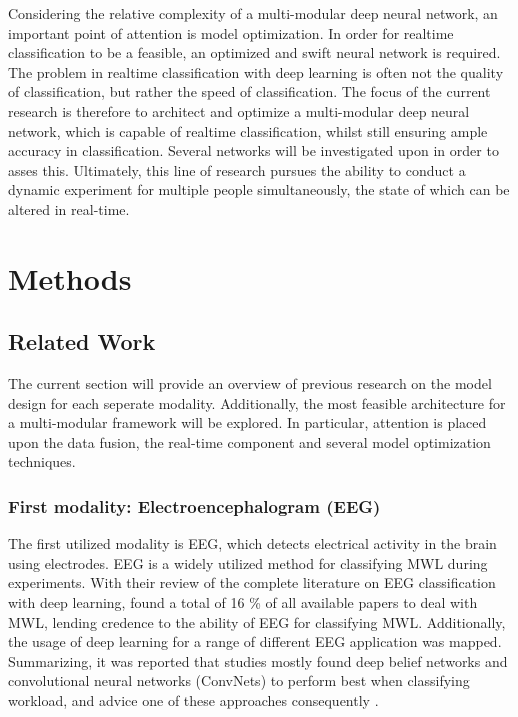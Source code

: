 \documentclass[12pt]{article}
\begin{document}
Considering the relative complexity of a multi-modular deep neural network, an important point of attention is model optimization. In order for realtime classification to be a feasible, an optimized and swift neural network is required. The problem in realtime classification with deep learning is often not the quality of classification, but rather the speed of classification. The focus of the current research is therefore to architect and optimize a multi-modular deep neural network, which is capable of realtime classification, whilst still ensuring ample accuracy in classification. Several networks will be investigated upon in order to asses this. Ultimately, this line of research pursues the ability to conduct a dynamic experiment for multiple people simultaneously, the state of which can be altered in real-time. 

\newpage
\section{Methods}

\subsection{Related Work} \label{Relatedwork}
The current section will provide an overview of previous research on the model design for each seperate modality. Additionally,  the most feasible architecture for a multi-modular framework will be explored. In particular, attention is placed upon the data fusion, the real-time component and several model optimization techniques.

\subsubsection{First modality: Electroencephalogram (EEG)}
The first utilized modality is EEG, which detects electrical activity in the brain using electrodes. EEG is a widely utilized method for classifying MWL during experiments. With their review of the complete literature on EEG classification with deep learning,  found a total of 16 \% of all available papers to deal with MWL, lending credence to the ability of EEG for classifying MWL. Additionally, the usage of deep learning for a range of different EEG application was mapped. Summarizing, it was reported that studies mostly found deep belief networks and convolutional neural networks (ConvNets) to perform best when classifying workload, and advice one of these approaches consequently \cite{craik2019deep}.
\end{document}

